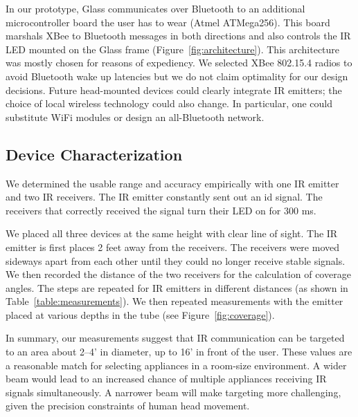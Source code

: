 \documentclass{sigchi}
\begin{document}
In our prototype, Glass communicates over Bluetooth to an additional microcontroller board the user has to wear (Atmel ATMega256). This board marshals XBee to Bluetooth messages in both directions and also controls the IR LED mounted on the Glass frame (Figure~\ref{fig:architecture}). This architecture was mostly chosen for reasons of expediency. We selected XBee 802.15.4 radios to avoid Bluetooth  wake up latencies but we do not claim optimality for our design decisions. Future head-mounted devices could clearly integrate IR emitters; the choice of local wireless technology could also change. In particular, one could substitute WiFi modules or design an all-Bluetooth network.

\subsection{Device Characterization}
We determined the usable range and accuracy empirically with one IR emitter and two IR receivers. The IR emitter constantly sent out an id signal. The receivers that correctly received the signal turn their LED on for 300 ms.

We placed all three devices at the same height with clear line of sight. The IR emitter is first places 2 feet away from the receivers. The receivers were moved sideways apart from each other until they could no longer receive stable signals. We then recorded the distance of the two receivers for the calculation of coverage angles. The steps are repeated for IR emitters in different distances (as shown in Table~\ref{table:measurements}). We then repeated measurements with the emitter  placed at various depths in the tube (see Figure~\ref{fig:coverage}). 

In summary, our measurements suggest that IR communication can be targeted to an area about 2--4' in diameter, up to 16' in front of the user. These values are a reasonable match for selecting appliances in a room-size environment. A wider beam would lead to an increased chance of multiple appliances receiving IR signals simultaneously. A narrower beam will make targeting more challenging, given the precision constraints of human head movement.
\end{document}
